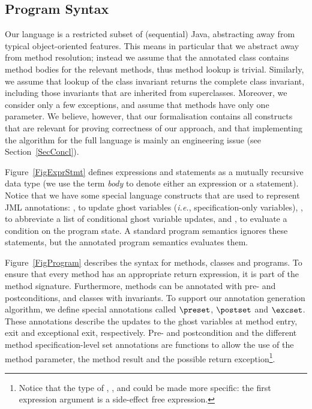 \subsection{Program Syntax}\label{SecSyntax}

Our language is a restricted subset of (sequential) Java, abstracting
away from typical object-oriented features. This means in particular
that we abstract away from method resolution; instead we assume that
the annotated class contains method bodies for the relevant methods,
thus method lookup is trivial. Similarly, we assume that lookup of the
class invariant returns the complete class invariant, including those
invariants that are inherited from superclasses. Moreover, we consider
only a few exceptions, and assume that methods have only one
parameter. We believe, however, that our formalisation contains all
constructs that are relevant for proving correctness of our approach,
and that implementing the algorithm for the full language is mainly an
engineering issue (see Section~\ref{SecConcl}).

Figure~\ref{FigExprStmt} defines expressions and statements as a
mutually recursive data type (we use the term \emph{body} to denote
either an expression or a statement). Notice that we have some special
language constructs that are used to represent JML annotations: \Set,
to update ghost variables (\emph{i.e.}, specification-only variables),
\CaseJML, to abbreviate a list of conditional ghost variable updates,
and \Assert, to evaluate a condition on the program state. A standard
program semantics ignores these statements, but the annotated program
semantics evaluates them.

Figure~\ref{FigProgram} describes the syntax for methods,
classes and programs. To ensure that every method has an appropriate
return expression, it is part of the method signature.
Furthermore, methods can be annotated with pre- and postconditions, and
classes with invariants. To support our annotation generation
algorithm, we define special annotations called
\(\preset\), \(\postset\) and \(\excset\). These annotations describe
the updates to the ghost variables at method entry, exit and
exceptional exit, respectively.
Pre- and postcondition and the different method specification-level set
annotations are functions to allow the use of the method parameter,
the method result and the possible return exception\footnote{Notice
that the type of \pre, \post, \preset and \postset could be made more specific:
the first expression argument is a side-effect free expression.}.

